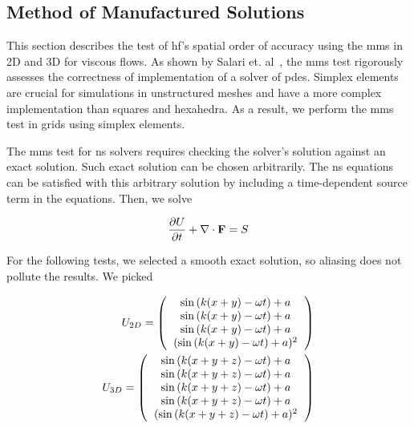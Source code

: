 \graphicspath{{figures_manufactured/}}%


\subsection{Method of Manufactured Solutions}

This section describes the test of \gls{hf}'s spatial order of accuracy using the \gls{mms} in 2D and 3D for viscous flows. As shown by Salari et. al~\cite{salari2000code}, the \gls{mms} test rigorously assesses the correctness of implementation of a solver of \gls{pde}s. Simplex elements are crucial for simulations in unstructured meshes and have a more complex implementation than squares and hexahedra. As a result, we perform the \gls{mms} test in grids using simplex elements.

The \gls{mms} test for \gls{ns} solvers requires checking the solver's solution against an exact solution. Such exact solution can be chosen arbitrarily. The \gls{ns} equations can be satisfied with this arbitrary solution by including a time-dependent source term in the equations. Then, we solve

\begin{equation}
\frac{\partial U}{\partial t} +  \nabla \cdot {\bf F} = S
\end{equation}

For the following tests, we selected a smooth exact solution, so aliasing does not pollute the results. We picked

\begin{equation}\label{eq:NSwithSource}
\begin{split}
U_{2D} = \l(
\begin{tabular}{c}
$\sin{(k(x+y) - \omega t)} + a$\\
$\sin{(k(x+y) - \omega t)} + a$\\
$\sin{(k(x+y) - \omega t)} + a$\\
$(\sin{(k(x+y) - \omega t)} + a)^2$
\end{tabular}
\r) \\
U_{3D} = \l(
\begin{tabular}{c}
$\sin{(k(x+y+z) - \omega t)} + a$\\
$\sin{(k(x+y+z) - \omega t)} + a$\\
$\sin{(k(x+y+z) - \omega t)} + a$\\
$\sin{(k(x+y+z) - \omega t)} + a$\\
$(\sin{(k(x+y+z) - \omega t)} + a)^2$
\end{tabular}
\r)
\end{split}
\end{equation}

